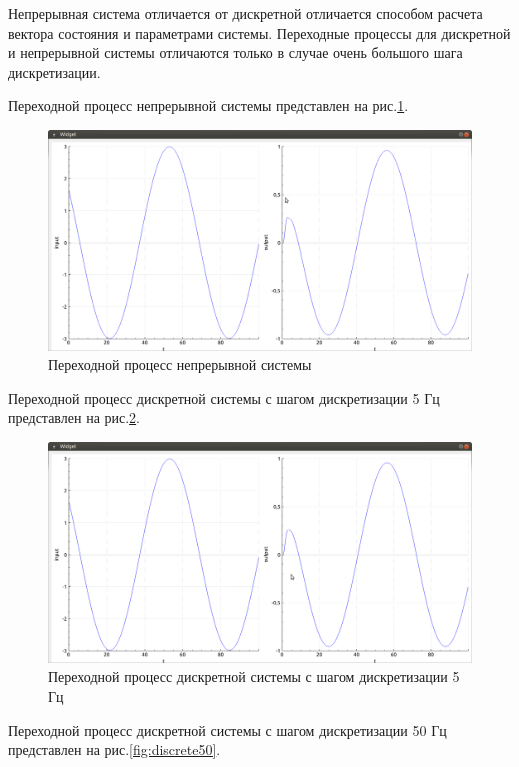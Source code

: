 \documentclass[14pt,a4paper]{extreport}
\begin{document}
Непрерывная система отличается от дискретной отличается способом 
расчета вектора состояния и параметрами системы. Переходные процессы для дискретной и непрерывной системы отличаются 
только в случае очень большого шага дискретизации.

Переходной процесс непрерывной системы 
представлен на рис.\ref{fig:contin}.
\begin{figure}[H]
    \centering
    \includegraphics[width=160mm]{img/cont.png}
    \caption{Переходной процесс непрерывной системы}
    \label{fig:contin}
\end{figure}

Переходной процесс дискретной системы с шагом дискретизации 
5 Гц представлен на рис.\ref{fig:discrete5}.
\begin{figure}[H]
    \centering
    \includegraphics[width=160mm]{img/5hz.png}
    \caption{Переходной процесс дискретной системы 
    с шагом дискретизации 5 Гц}
    \label{fig:discrete5}
\end{figure}

Переходной процесс дискретной системы с шагом дискретизации 
50 Гц представлен на рис.\ref{fig:discrete50}.
\end{document}

